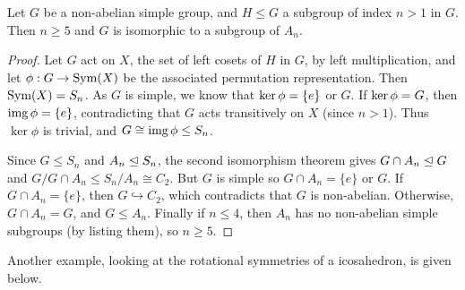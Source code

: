 \documentclass[a4paper]{scrartcl}
\begin{document}
\begin{theorem}
	Let $G$ be a non-abelian simple group, and $H\leq G$ a subgroup of index $n > 1$ in $G$. Then $n \geq 5$ and $G$ is isomorphic to a subgroup of $A_n$.
\end{theorem}
\begin{proof}
	Let $G$ act on $X$, the set of left cosets of $H$ in $G$, by left multiplication, and let $\phi: G \rightarrow \operatorname{Sym}(X)$ be the associated permutation representation. Then $\operatorname{Sym}(X) = S_n$. As $G$ is simple, we know that $\operatorname{ker} \phi = \{e\}$ or $G$. If $\operatorname{ker} \phi = G$, then $\operatorname{img} \phi = \{e\}$, contradicting that $G$ acts transitively on $X$ (since $n > 1$). Thus $\ker \phi$ is trivial, and $G \cong \operatorname{img} \phi \leq S_n$.

	Since $G \leq S_n$ and $A_n \trianglelefteq S_n$, the second isomorphism theorem gives $G \cap A_n \trianglelefteq G$ and $G / G \cap A_n \leq S_n / A_n \cong C_2$. But $G$ is simple so $G \cap A_n = \{e\}$ or $G$. If $G \cap A_n = \{e\}$, then $G \hookrightarrow C_2$, which contradicts that $G$ is non-abelian. Otherwise, $G \cap A_n = G$, and $G \leq A_n$. Finally if $n \leq 4$, then $A_n$ has no non-abelian simple subgroups (by listing them), so $n \geq 5$.
\end{proof}

Another example, looking at the rotational symmetries of a icosahedron, is given below.
\end{document}

